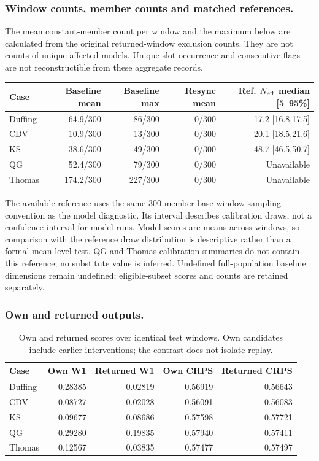 \documentclass[gmd,manuscript]{copernicus}
\begin{document}
\subsubsection{Window counts, member counts and matched references.}
The mean constant-member count per window and the maximum below are calculated from the original returned-window exclusion counts. They are not counts of unique affected models. Unique-slot occurrence and consecutive flags are not reconstructible from these aggregate records.
\begin{center}\small\begin{tabular}{lrrrr}\toprule Case & Baseline mean & Baseline max & Resync mean & Ref. $N_{\rm eff}$ median [5--95\%]\\\midrule
Duffing & 64.9/300 & 86/300 & 0/300 & 17.2 [16.8,17.5]\\
CDV & 10.9/300 & 13/300 & 0/300 & 20.1 [18.5,21.6]\\
KS & 38.6/300 & 49/300 & 0/300 & 48.7 [46.5,50.7]\\
QG & 52.4/300 & 79/300 & 0/300 & Unavailable\\
Thomas & 174.2/300 & 227/300 & 0/300 & Unavailable\\
\bottomrule\end{tabular}\end{center}
The available reference uses the same 300-member base-window sampling convention as the model diagnostic. Its interval describes calibration draws, not a confidence interval for model runs. Model scores are means across windows, so comparison with the reference draw distribution is descriptive rather than a formal mean-level test. QG and Thomas calibration summaries do not contain this reference; no substitute value is inferred. Undefined full-population baseline dimensions remain undefined; eligible-subset scores and counts are retained separately.


\subsubsection{Own and returned outputs.}
\begin{table}[htbp]\caption{Own and returned scores over identical test windows. Own candidates include earlier interventions; the contrast does not isolate replay.}\label{tab:own-returned-test}
\centering\small\begin{tabular}{lrrrr}\toprule
Case & Own W1 & Returned W1 & Own CRPS & Returned CRPS\\\midrule
Duffing & 0.28385 & 0.02819 & 0.56919 & 0.56643 \\
CDV & 0.08727 & 0.02028 & 0.56091 & 0.56083 \\
KS & 0.09677 & 0.08686 & 0.57598 & 0.57721 \\
QG & 0.29280 & 0.19835 & 0.57940 & 0.57411 \\
Thomas & 0.12567 & 0.03835 & 0.57477 & 0.57497 \\
\bottomrule\end{tabular}\end{table}
\end{document}
